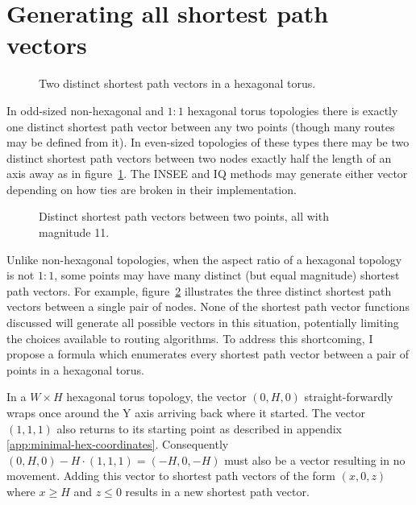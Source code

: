 	\section{Generating all shortest path vectors}
			
			\begin{figure}
				\center
				
				\caption{Two distinct shortest path vectors in a hexagonal torus.}
				\label{fig:wrap-alternatives}
			\end{figure}
			
			In odd-sized non-hexagonal and $1:1$ hexagonal torus topologies there is
			exactly one distinct shortest path vector between any two points (though
			many routes may be defined from it). In even-sized topologies of these
			types there may be two distinct shortest path vectors between two nodes
			exactly half the length of an axis away as in
			figure~\ref{fig:wrap-alternatives}. The INSEE and IQ methods may generate
			either vector depending on how ties are broken in their implementation.
			
			\begin{figure}
				\center
				
				\caption[Distinct shortest path vectors in non-square topologies.]%
				{Distinct shortest path vectors between two points, all with
				magnitude 11.}
				\label{fig:spiralling}
			\end{figure}
			
			Unlike non-hexagonal topologies, when the aspect ratio of a hexagonal
			topology is not $1:1$, some points may have many distinct (but equal
			magnitude) shortest path vectors.  For example,
			figure~\ref{fig:spiralling} illustrates the three distinct shortest path
			vectors between a single pair of nodes. None of the shortest path vector
			functions discussed will generate all possible vectors in this situation,
			potentially limiting the choices available to routing algorithms.  To
			address this shortcoming, I propose a formula which enumerates every
			shortest path vector between a pair of points in a hexagonal torus.
			
			In a $W \times H$ hexagonal torus topology, the vector $(0, H, 0)$
			straight-forwardly wraps once around the Y axis arriving back where it
			started. The vector $(1,1,1)$ also returns to its starting point as
			described in appendix \ref{app:minimal-hex-coordinates}. Consequently
			$(0,H,0) - H\cdot(1,1,1) = (-H, 0, -H)$ must also be a vector resulting
			in no movement.  Adding this vector to shortest path vectors of the form
			$(x, 0, z)$ where $x\ge H$ and $z\le0$ results in a new shortest path
			vector.
			
